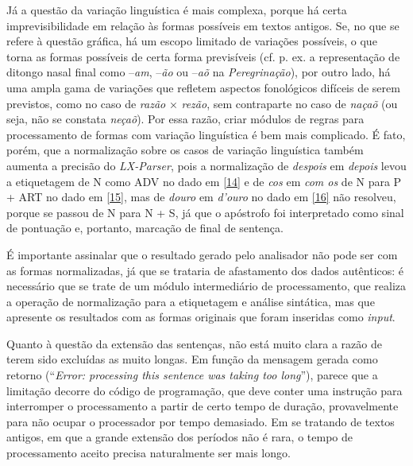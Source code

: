 \documentclass[portuguese]{textolivre}
\begin{document}
Já a questão da variação linguística é mais complexa, porque há certa imprevisibilidade em relação às formas possíveis em textos antigos. Se, no que se refere à questão gráfica, há um escopo limitado de variações possíveis, o que torna as formas possíveis de certa forma previsíveis (cf. p. ex. a representação de ditongo nasal final como –\textit{am}, –\textit{ão} ou –\textit{aõ} na \textit{Peregrinação}), por outro lado, há uma ampla gama de variações que refletem aspectos fonológicos difíceis de serem previstos, como no caso de \textit{razão} × \textit{rezão}, sem contraparte no caso de \textit{naçaõ} (ou seja, não se constata \textit{neçaõ}). Por essa razão, criar módulos de regras para processamento de formas com variação linguística é bem mais complicado. É fato, porém, que a normalização sobre os casos de variação linguística também aumenta a precisão do \textit{LX-Parser}, pois a normalização de \textit{despois} em \textit{depois} levou a etiquetagem de N como ADV no dado em \ref{14} e de \textit{cos} em \textit{com os} de N para P + ART no dado em \ref{15}, mas de \textit{douro} em \textit{d’ouro} no dado em \ref{16} não resolveu, porque se passou de N para N + S, já que o apóstrofo foi interpretado como sinal de pontuação e, portanto, marcação de final de sentença.

É importante assinalar que o resultado gerado pelo analisador não pode ser com as formas normalizadas, já que se trataria de afastamento dos dados autênticos: é necessário que se trate de um módulo intermediário de processamento, que realiza a operação de normalização para a etiquetagem e análise sintática, mas que apresente os resultados com as formas originais que foram inseridas como \textit{input}.

Quanto à questão da extensão das sentenças, não está muito clara a razão de terem sido excluídas as muito longas. Em função da mensagem gerada como retorno (“\textit{Error: processing this sentence was taking too long}”), parece que a limitação decorre do código de programação, que deve conter uma instrução para interromper o processamento a partir de certo tempo de duração, provavelmente para não ocupar o processador por tempo demasiado. Em se tratando de textos antigos, em que a grande extensão dos períodos não é rara, o tempo de processamento aceito precisa naturalmente ser mais longo.
\end{document}
